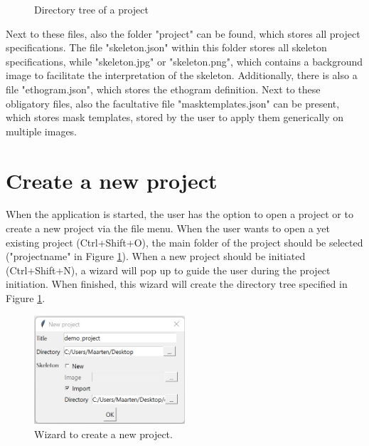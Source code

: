 \documentclass[a4paper, 11pt]{article}
\begin{document}
\begin{figure}[htb]
	\centering
	\begin{minipage}{5cm}	
	\end{minipage}
	\caption{Directory tree of a project}
	\label{fig:project_dir_tree}
\end{figure}

Next to these files, also the folder "project" can be found, which stores all project specifications. The file "skeleton.json" within this folder stores all skeleton specifications, while  "skeleton.jpg" or "skeleton.png", which contains a background image to facilitate the interpretation of the skeleton. Additionally, there is also a file "ethogram.json", which stores the ethogram definition.  Next to these obligatory files, also the facultative file "mask\textunderscore templates.json" can be present, which stores mask templates, stored by the user to apply them generically on multiple images.

\section{Create a new project}
When the application is started, the user has the option to open a project or to create a new project via the file menu. When the user wants to open a yet existing project (Ctrl+Shift+O), the main folder of the project should be selected ("project\textunderscore name" in Figure \ref{fig:project_dir_tree}). When a new project should be initiated (Ctrl+Shift+N), a wizard will pop up to guide the user during the project initiation. When finished, this wizard will create the directory tree specified in Figure \ref{fig:project_dir_tree}.

\begin{figure}[htb]
	\centering
	\includegraphics[width=0.5\textwidth]{new_project_wizard}
	\captionsetup{width=0.5\textwidth}
	\caption{Wizard to create a new project.}
	\label{fig:new_project_wizard}	
\end{figure}
\end{document}
